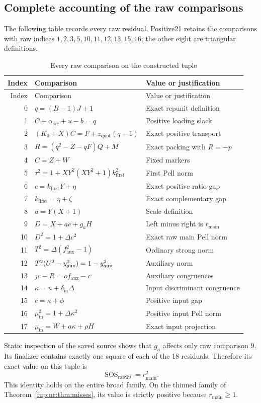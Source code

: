 \documentclass[11pt,letterpaper]{article}
\theoremstyle{definition}\newtheorem{definition}[theorem]{Definition}
\theoremstyle{remark}\newtheorem{remark}[theorem]{Remark}
\newcommand{\zquot}{z_{\mathrm{quot}}}\newcommand{\ga}{g_a}
\newcommand{\faux}{f_{\mathrm{aux}}}\newcommand{\rmain}{r_{\mathrm{main}}}\newcommand{\acent}{\mathcal F}
\begin{document}
\subsection{Complete accounting of the raw comparisons}
The following table records every raw residual. Positive21 retains the comparisons with raw indices $1,2,3,5,10,11,12,13,15,16$; the other eight are triangular definitions.
\begingroup\small
\begin{longtable}{@{}r p{} p{}@{}}
\caption{Every raw comparison on the constructed tuple}\label{fup:nr:tab:residuals}\\
\toprule Index & Comparison & Value or justification\\\midrule
\endfirsthead
\toprule Index & Comparison & Value or justification\\\midrule
\endhead
0 & $q=(B-1)J+1$ & Exact repunit definition\\
1 & $C+\alpha_{\mathrm{src}}+u-b=q$ & Positive loading slack\\
2 & $(K_0+X)C=F+\zquot(q-1)$ & Exact positive transport\\
3 & $R=(q^2-Z-qF)Q+M$ & Exact packing with $R=-p$\\
4 & $C=Z+W$ & Fixed markers\\
5 & $\tau^2=1+XY^2(XY^2+1)k_{\mathrm{first}}^2$ & First Pell norm\\
6 & $c=k_{\mathrm{first}}Y+\eta$ & Exact positive ratio gap\\
7 & $k_{\mathrm{first}}=\eta+\zeta$ & Exact complementary gap\\
8 & $a=Y(X+1)$ & Scale definition\\
9 & $D=X+ac+\ga H$ & Left minus right is $\rmain$\\
10 & $D^2=1+\Delta c^2$ & Exact raw main Pell norm\\
11 & $T^2=\Delta(\faux^2-1)$ & Ordinary strong norm\\
12 & $T^2(U^2-y_{\mathrm{aux}}^2)=1-y_{\mathrm{aux}}^2$ & Auxiliary norm\\
13 & $jc-R=o\faux-c$ & Auxiliary congruences\\
14 & $\kappa=u+\delta_{\mathrm{in}}\Delta$ & Input discriminant congruence\\
15 & $c=\kappa+\phi$ & Positive input gap\\
16 & $\mu_{\mathrm{in}}^2=1+\Delta\kappa^2$ & Positive input Pell norm\\
17 & $\mu_{\mathrm{in}}=W+a\kappa+\rho H$ & Exact input projection\\
\bottomrule
\end{longtable}
\endgroup
Static inspection of the saved source shows that $\ga$ affects only raw comparison $9$. Its finalizer contains exactly one square of each of the 18 residuals. Therefore its exact value on this tuple is
\begin{equation}\label{fup:nr:eq:rawsos}
 \operatorname{SOS}_{\mathrm{raw29}}=\rmain^2.
\end{equation}
This identity holds on the entire broad family. On the thinned family of Theorem~\ref{fup:nr:thm:misses}, its value is strictly positive because $\rmain\ge1$.
\end{document}
